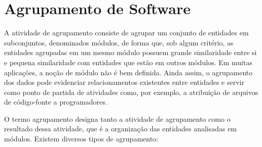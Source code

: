 %
% 

\chapter{Agrupamento de Software}

A atividade de agrupamento consiste de agrupar um conjunto de entidades em subconjuntos, denominados módulos, de forma que, sob algum critério, as entidades agrupadas em um mesmo módulo possuem grande similaridade entre si e pequena similaridade com entidades que estão em outros módulos. Em muitas aplicações, a noção de módulo não é bem definida. Ainda assim, o agrupamento dos dados pode evidenciar relacionamentos existentes entre entidades e servir como ponto de partida de atividades como, por exemplo, a atribuição de arquivos de código-fonte a programadores.

O termo agrupamento designa tanto a atividade de agrupamento como o resultado dessa atividade, que é a organização das entidades analisadas em módulos. Existem diversos tipos de agrupamento:

